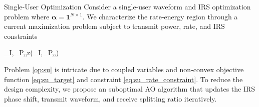 \documentclass{IEEEtran}
\begin{document}
\begin{section}{Single-User Optimization}
	Consider a single-user waveform and IRS optimization problem where $\boldsymbol{\alpha}=\boldsymbol{1}^{N \times 1}$. We characterize the rate-energy region through a current maximization problem subject to transmit power, rate, and IRS constraints
	\begin{maxi!}
		{_I,_P,\boldsymbol{\phi},\rho}{z(_I,_P,\boldsymbol{\phi},\rho)}{\label{op:su}}{\label{eq:su_target}}
		\label{eq:su_rate_constraint}
	\end{maxi!}
	Problem \ref{op:su} is intricate due to coupled variables and non-convex objective function \ref{eq:su_target} and constraint \ref{eq:su_rate_constraint}. To reduce the design complexity, we propose an suboptimal AO algorithm that updates the IRS phase shift, transmit waveform, and receive splitting ratio iteratively.


\end{section}
\end{document}
